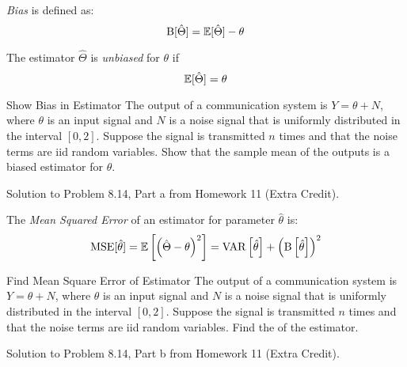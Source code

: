 			\begin{definition}[Bias] \label{def:Bias}
				\emph{Bias} is defined as:
				\begin{equation} \label{eq:Accuracy}
					\operatorname{\operatorname{B}} [ \hat{\Theta} ] = \operatorname{\operatorname{\mathbb{E}}} [ \hat{\Theta} ] - \theta
				\end{equation}
				\begin{remark} \label{rmk:Unbiased}
					The estimator $\hat{\Theta}$ is \emph{unbiased} for $\theta$ if
					\begin{equation} \label{Unbiased}
						\operatorname{\operatorname{\mathbb{E}}} [ \hat{\Theta} ] = \theta
					\end{equation}
				\end{remark}
			\end{definition}
			\begin{example}[Problem 8.14]{Show Bias in Estimator}
                          The output of a communication system is $Y = \theta + N$, where $\theta$ is an input signal and $N$ is a noise signal that is uniformly distributed in the interval $\left[ 0,2 \right]$.
                          Suppose the signal is transmitted $n$ times and that the noise terms are iid random variables.
                          Show that the sample mean of the outputs is a biased estimator for $\theta$.

                          \tcblower

                          Solution to Problem 8.14, Part a from Homework 11 (Extra Credit).
			\end{example}
					
			\begin{definition} \label{def:Mean Squared Error}
				The \emph{Mean Squared Error} of an estimator for parameter $\hat{\theta}$ is:
				\begin{equation} \label{eq:Mean Squared Error}
					\operatorname{\operatorname{MSE}} [ \hat{\theta} ]
					= \operatorname{\operatorname{\mathbb{E}}} \left[ \left( \hat{\Theta} - \theta \right)^{2} \right]
					= \operatorname{\operatorname{VAR}} \left[ \hat{\theta} \right] + \left( \operatorname{\operatorname{B}} \left[ \hat{\theta} \right] \right)^{2}
				\end{equation}
			\end{definition}
			\begin{example}[Problem 8.14]{Find Mean Square Error of Estimator}
                          The output of a communication system is $Y = \theta + N$, where $\theta$ is an input signal and $N$ is a noise signal that is uniformly distributed in the interval $\left[ 0,2 \right]$.
                          Suppose the signal is transmitted $n$ times and that the noise terms are iid random variables.
                          Find the  of the estimator.

                          \tcblower

                          Solution to Problem 8.14, Part b from Homework 11 (Extra Credit).
			\end{example}
		
